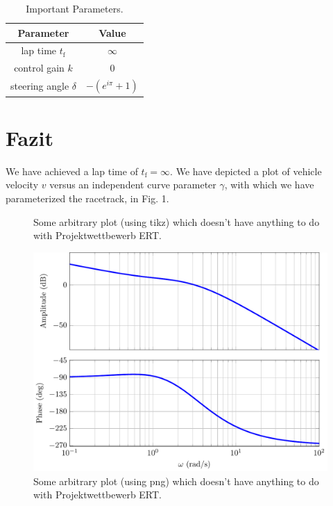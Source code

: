 \documentclass[pdf]{ifacconf}
\begin{document}
\begin{table}[h]
\caption{Important Parameters.}
\label{table:working plan}
\centering
\begin{tabular}{|c|c|}
\hline
\bfseries Parameter & \bfseries Value \\ \hline \hline
lap time $t_{\text{f}}$ & $\infty$ \\ \hline
control gain $k$ & $0$ \\ \hline
steering angle $\delta$ & $-\left( e^{i \pi}+1\right)$ \\ \hline
 \end{tabular}
\end{table}

\section{Fazit}
We have achieved a lap time of $t_{\text{f}}=\infty$. We have depicted a plot of vehicle velocity $v$ versus an independent curve parameter $\gamma$, with which we have parameterized the racetrack, in Fig. 1. 

\begin{figure}[h] %
\begin{center}

\caption{Some arbitrary plot (using tikz) which doesn't have anything to do with Projektwettbewerb ERT.}
\label{fig1}
\end{center}
\end{figure}

\begin{figure}[h] %
\begin{center}
\includegraphics[width=.8\columnwidth]{bode} %
\caption{Some arbitrary plot (using png) which doesn't have anything to do with Projektwettbewerb ERT.}
\label{fig1}
\end{center}
\end{figure}





%
%

\end{document}
